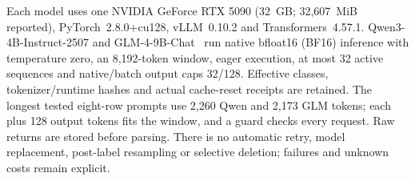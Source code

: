 Each model uses one NVIDIA GeForce RTX 5090 (32~GB; 32,607~MiB reported), PyTorch~2.8.0+cu128, vLLM~0.10.2 and Transformers~4.57.1. Qwen3-4B-Instruct-2507 and GLM-4-9B-Chat~\cite{qwen,glm} run native bfloat16 (BF16) inference with temperature zero, an 8,192-token window, eager execution, at most 32 active sequences and native/batch output caps 32/128. Effective classes, tokenizer/runtime hashes and actual cache-reset receipts are retained. The longest tested eight-row prompts use 2,260 Qwen and 2,173 GLM tokens; each plus 128 output tokens fits the window, and a guard checks every request. Raw returns are stored before parsing. There is no automatic retry, model replacement, post-label resampling or selective deletion; failures and unknown costs remain explicit.
